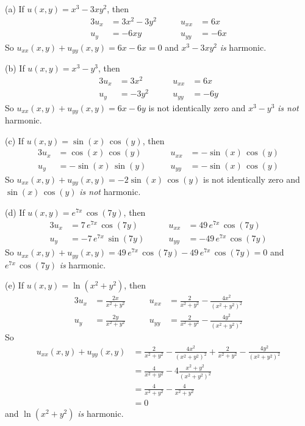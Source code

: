 \begin{solution}
(a) If $u(x,y) = x^3-3xy^2$, then
\begin{alignat*}{3}
u_x&= 3x^2-3y^2 \qquad& u_{xx}&= 6x \\
u_y&= -6xy \qquad& u_{yy}&= -6x 
\end{alignat*}
So $u_{xx}(x,y)+u_{yy}(x,y)=6x-6x=0$ and $x^3-3xy^2$ \emph{is} harmonic.

(b) If $u(x,y) = x^3-y^3$, then
\begin{alignat*}{3}
u_x&= 3x^2 \qquad& u_{xx}&= 6x \\
u_y&= -3y^2 \qquad& u_{yy}&= -6y 
\end{alignat*}
So $u_{xx}(x,y)+u_{yy}(x,y)=6x-6y$ is not identically zero and $x^3-y^3$ 
\emph{is not} harmonic.

(c) If $u(x,y) = \sin(x)\,\cos(y)$, then
\begin{alignat*}{3}
u_x&= \cos(x)\,\cos(y) \qquad& u_{xx}&= -\sin(x)\,\cos(y) \\
u_y&= -\sin(x)\,\sin(y) \qquad& u_{yy}&= -\sin(x)\,\cos(y) 
\end{alignat*}
So $u_{xx}(x,y)+u_{yy}(x,y)=-2\sin(x)\,\cos(y)$ is not identically zero 
and $\sin(x)\,\cos(y)$ 
\emph{is not} harmonic.

(d) If $u(x,y) = e^{7x}\,\cos(7y)$, then
\begin{alignat*}{3}
u_x&= 7\,e^{7x}\,\cos(7y) \qquad& u_{xx}&= 49\,e^{7x}\,\cos(7y) \\
u_y&= -7\,e^{7x}\ \sin(7y) \qquad& u_{yy}&= -49\,e^{7x}\,\cos(7y) 
\end{alignat*}
So $u_{xx}(x,y)+u_{yy}(x,y)=49\,e^{7x}\,\cos(7y)-49\,e^{7x}\,\cos(7y)=0$ 
and $e^{7x}\,\cos(7y)$ \emph{is} harmonic.

(e) If $u(x,y) = \ln(x^2+y^2)$, then
\begin{alignat*}{3}
u_x&= \frac{2x}{x^2+y^2} \qquad& 
        u_{xx}&= \frac{2}{x^2+y^2}- \frac{4x^2}{{(x^2+y^2)}^2}\\
u_y&= \frac{2y}{x^2+y^2} \qquad& 
        u_{yy}&= \frac{2}{x^2+y^2}- \frac{4y^2}{{(x^2+y^2)}^2} 
\end{alignat*}
So 
\begin{align*}
u_{xx}(x,y)+u_{yy}(x,y)&=\frac{2}{x^2+y^2}- \frac{4x^2}{{(x^2+y^2)}^2}
                        +\frac{2}{x^2+y^2}- \frac{4y^2}{{(x^2+y^2)}^2} \\
&=\frac{4}{x^2+y^2} - 4\frac{x^2+y^2}{{(x^2+y^2)}^2} \\
&=\frac{4}{x^2+y^2}-\frac{4}{x^2+y^2} \\
&=0
\end{align*} 
and $\ln(x^2+y^2)$ \emph{is} harmonic.

\end{solution}



